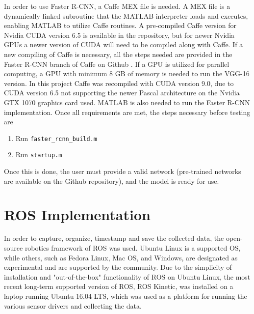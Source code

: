 In order to use Faster R-CNN, a Caffe MEX file is needed. A MEX file is a dynamically linked subroutine that the MATLAB interpreter loads and executes, enabling MATLAB to utilize Caffe routines. A pre-compiled Caffe version for Nvidia CUDA version 6.5 is available in the repository, but for newer Nvidia GPUs a newer version of CUDA will need to be compiled along with Caffe. If a new compiling of Caffe is necessary, all the steps needed are provided in the Faster R-CNN branch of Caffe on Github \cite{caffe_for_faster_rcnn}. If a GPU is utilized for parallel computing, a GPU with minimum 8 GB of memory is needed to run the VGG-16 version. In this project Caffe was recompiled with CUDA version 9.0, due to CUDA version 6.5 not supporting the newer Pascal architecture on the Nvidia GTX 1070 graphics card used. MATLAB is also needed to run the Faster R-CNN implementation. Once all requirements are met, the steps necessary before testing are
\begin{enumerate}
	\item Run \lstinline[basicstyle=\ttfamily]{faster_rcnn_build.m}
	\item Run \lstinline[basicstyle=\ttfamily]{startup.m}
\end{enumerate}
Once this is done, the user must provide a valid network (pre-trained networks are available on the Github repository), and the model is ready for use.
\section{ROS Implementation}
In order to capture, organize, timestamp and save the collected data, the open-source robotics framework of ROS was used. Ubuntu Linux is a supported OS, while others, such as Fedora Linux, Mac OS, and Windows, are designated as experimental and are supported by the community. Due to the simplicity of installation and "out-of-the-box" functionality of ROS on Ubuntu Linux, the most recent long-term supported version of ROS, ROS Kinetic, was installed on a laptop running Ubuntu 16.04 LTS, which was used as a platform for running the various sensor drivers and collecting the data.
